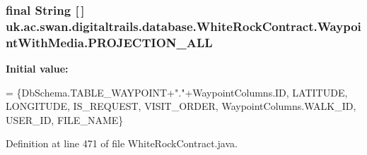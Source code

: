 \hypertarget{classuk_1_1ac_1_1swan_1_1digitaltrails_1_1database_1_1_white_rock_contract_1_1_waypoint_with_media_a0c156744c67dda2e480fce214762644c}{
\subsubsection[{P\+R\+O\+J\+E\+C\+T\+I\+O\+N\+\_\+\+A\+L\+L}]{\setlength{\rightskip}{0pt plus 5cm}final String \mbox{[}$\,$\mbox{]} uk.\+ac.\+swan.\+digitaltrails.\+database.\+White\+Rock\+Contract.\+Waypoint\+With\+Media.\+P\+R\+O\+J\+E\+C\+T\+I\+O\+N\+\_\+\+A\+L\+L\hspace{0.3cm}{\ttfamily [static]}}}\label{classuk_1_1ac_1_1swan_1_1digitaltrails_1_1database_1_1_white_rock_contract_1_1_waypoint_with_media_a0c156744c67dda2e480fce214762644c}
{\bfseries Initial value\+:}
\begin{DoxyCode}
= \{DbSchema.TABLE\_WAYPOINT+\textcolor{stringliteral}{"."}+WaypointColumns.ID, LATITUDE, LONGITUDE, IS\_REQUEST, VISIT\_ORDER,
                                                        WaypointColumns.WALK\_ID, USER\_ID,
                                                        FILE\_NAME\}
\end{DoxyCode}


Definition at line 471 of file White\+Rock\+Contract.\+java.

